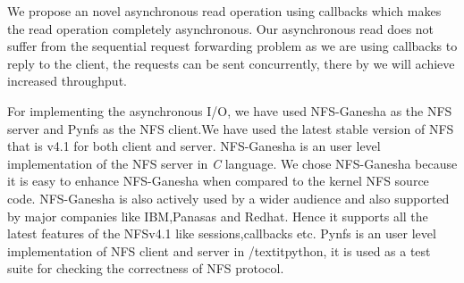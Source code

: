 	We propose an novel asynchronous read operation using callbacks which makes the read operation completely asynchronous. Our asynchronous read does not suffer from the sequential request forwarding problem as we are using callbacks to reply to the client, the requests can be sent concurrently, there by we will achieve increased throughput. 

For implementing the asynchronous I/O, we have used NFS-Ganesha \cite{ganesha} as the NFS server and Pynfs \cite{pynfs} as the NFS client.We have used the latest stable version of NFS that is v4.1 for both client and server. NFS-Ganesha is an user level implementation of the NFS server in \textit{C} language. We chose NFS-Ganesha because it is easy to enhance NFS-Ganesha when compared to the kernel NFS source code. NFS-Ganesha is also actively used by a wider audience and also supported by major companies like IBM,Panasas and Redhat. Hence it supports all the latest features of the NFSv4.1 like sessions,callbacks etc. Pynfs is an user level implementation of NFS client and server in /textit{python}, it is used as a test suite for checking the correctness of NFS protocol.

